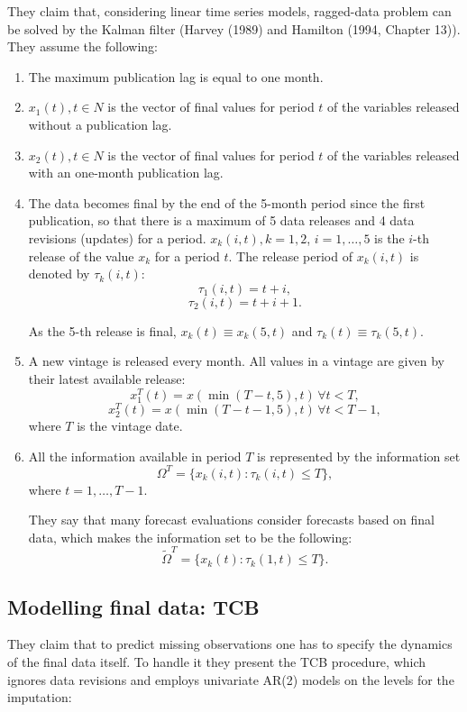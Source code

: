 \documentclass[8pt, a4paper, twocolumn, landscape]{extarticle}
\begin{document}
	They claim that, considering linear time series models, ragged-data problem can be solved by the Kalman filter (Harvey (1989) and Hamilton (1994, Chapter 13)). They assume the following:
	\begin{enumerate}
		\item The maximum publication lag is equal to one month.
		\item $x_1(t), t \in N$ is the vector of final values for period $t$ of the variables released without a publication lag.
		\item $x_2(t), t \in N$ is the vector of final values for period $t$ of the variables released with an one-month publication lag.
		\item The data becomes final by the end of the 5-month period since the first publication, so that there is a maximum of 5 data releases and 4 data revisions (updates) for a period. $x_k(i, t), k = 1, 2$, $ i = 1, \dots, 5$ is the $i$-th release of the value $x_k$ for a period $t$. The release period of $x_k(i, t)$ is denoted by $\tau_k(i, t)$:
		\[
		\tau_1(i, t) = t + i,
		\]
		\[
		\tau_2(i, t) = t + i + 1.
		\]
		
		As the 5-th release is final, $x_k(t) \equiv x_k(5, t)$ and $\tau_k(t) \equiv \tau_k(5, t)$. 
		\item A new vintage is released every month. All values in a vintage are given by their latest available release:
		\[
		x_1^T(t) = x(\min(T-t, 5), t) \, \forall t < T,
		\]
		\[
		x_2^T(t) = x(\min(T-t-1, 5), t) \, \forall t < T-1,
		\]
		where $T$ is the vintage date.
		\item All the information available in period $T$ is represented by the information
		set
		\[
		\Omega^T = \{ x_k(i, t) : \tau_k(i, t) \le T\},
		\]
		where $	t = 1, \dots, T-1$.
		
		They say that many forecast evaluations consider forecasts based on final data, which makes the information set to be the following:
		\[
		\tilde{\Omega}^T = \{ x_k(t) : \tau_k(1, t) \le T\}.
		\]
	
	\end{enumerate}

\subsection{Modelling final data: TCB}

They claim that to predict missing observations one has to specify the dynamics of the final data itself. To handle it they present the TCB procedure, which ignores data revisions and employs univariate AR(2) models on the levels for the imputation:
\end{document}
